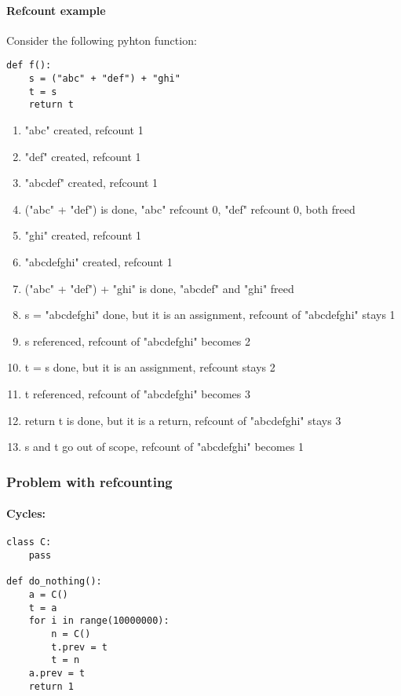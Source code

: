 \documentclass[12pt]{article}
\begin{document}

\paragraph{Refcount example} 
Consider the following pyhton function:
\begin{lstlisting}
def f():
    s = ("abc" + "def") + "ghi"
    t = s
    return t
\end{lstlisting}

\begin{enumerate}
  \item "abc" created, refcount 1
  \item "def" created, refcount 1
  \item "abcdef" created, refcount 1
  \item ("abc" + "def") is done, "abc" refcount 0, "def" refcount 0, both freed
  \item "ghi" created, refcount 1
  \item "abcdefghi" created, refcount 1
  \item ("abc" + "def") + "ghi" is done, "abcdef" and "ghi" freed
  \item s = "abcdefghi" done, but it is an assignment, refcount of "abcdefghi" stays 1
  \item s referenced, refcount of "abcdefghi" becomes 2
  \item t = s done, but it is an assignment, refcount stays 2
  \item t referenced, refcount of "abcdefghi" becomes 3
  \item return t is done, but it is a return, refcount of "abcdefghi" stays 3
  \item s and t go out of scope, refcount of "abcdefghi" becomes 1
\end{enumerate}

\subsubsection{Problem with refcounting}
\paragraph{Cycles:}

\begin{lstlisting}
class C:
    pass

def do_nothing():
    a = C()
    t = a
    for i in range(10000000):
        n = C()
        t.prev = t
        t = n
    a.prev = t
    return 1
\end{lstlisting}
\end{document}
